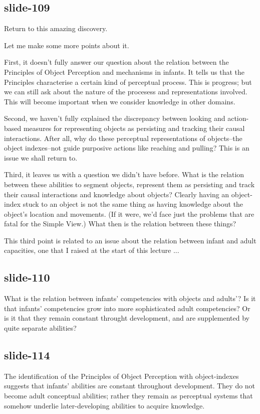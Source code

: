 \documentclass[12pt,\papersize]{extarticle}
\begin{document}
\subsection{slide-109}
Return to this amazing discovery.
 
Let me make some more points about it.
 
First, it doesn't fully answer our question about the relation between the Principles of Object
Perception and mechanisms in infants.  
It tells us that the Principles characterise a certain kind of perceptual process.
This is progress; but we can still ask about the nature of the procesess and representations 
involved.  This will become important when we consider knowledge in other domains.
 
Second, we haven't fully explained the discrepancy between looking and action-based measures for 
representing objects as persisting and tracking their causal interactions.
After all, why do these perceptual representations of objects--the object indexes--not guide 
purposive actions like reaching and pulling?
This is an issue we shall return to.
 
Third, it leaves us with a question we didn't have before.
What is the relation between these abilities to segment objects, represent them as persisting 
and track their causal interactions and knowledge about objects?
Clearly having an object-index stuck to an object is not the same thing as having knowledge
about the object's location and movements.  (If it were, we'd face just the problems that are 
fatal for the Simple View.)
What then is the relation between these things?
 
This third point is related to an issue about the relation between infant and adult capacities,
one that  I raised at the start of this lecture ...
 
\subsection{slide-110}
What is the relation between infants' competencies with objects and adults'?
Is it that infants' competencies grow into more sophisticated adult competencies?
Or is it that they remain constant throught development, and are supplemented by quite 
separate abilities?
 
\subsection{slide-114}
The identification of the Principles of Object Perception with object-indexes suggests that 
infants' abilities are constant throughout development.
They do not become adult conceptual abilities; rather they remain as perceptual systems
that somehow underlie later-developing abilities to acquire knowledge.
 
\end{document}
